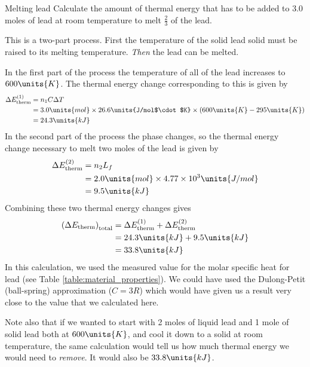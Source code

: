 \begin{example}{Melting lead}
  Calculate the amount of thermal energy that has to be added to 3.0 
  moles of lead at room temperature to melt $\frac{2}{3}$ of the lead. 

  \solution
  This is a two-part process.  First the temperature of the solid lead 
  solid must be raised to its melting temperature.  {\em Then} the 
  lead can be melted.

  In the first part of the process the temperature of all of the lead 
  increases to $600\units{K}$.  The thermal energy change corresponding 
  to this is given by 
  \begin{align}
    \Delta E_\text{therm}^{(1)} & = n_1C\Delta T \nonumber \\ 
    & = 3.0\units{mol}\times 26.6\units{J/mol$\cdot$K} \times
        (600\units{K} - 295\units{K}) \nonumber \\
    & = 24.3 \units{kJ}
  \end{align}
  In the second part of the process the phase changes, so the 
  thermal energy change necessary to melt two moles of the lead is given by
  \begin{align}
    \Delta E_\text{therm}^{(2)} & = n_2 L_f \nonumber \\ 
    & = 2.0\units{mol} \times 4.77\times 10^3\units{J/mol} \nonumber \\
    & = 9.5\units{kJ}
  \end{align}
  Combining these two thermal energy changes gives
  \begin{align}
    \left(\Delta E_\text{therm}\right)_\text{total} 
    & = \Delta E_\text{therm}^{(1)} + \Delta E_\text{therm}^{(2)} \nonumber \\
    & = 24.3\units{kJ} + 9.5\units{kJ} \nonumber \\
    & = 33.8\units{kJ} \
  \end{align} 
  In this calculation, we used the measured value for the molar
  specific heat for lead (see Table \ref{table:material_properties}).
  We could have used the Dulong-Petit (ball-spring) approximation ($C
  = 3R$) which would have given us a result very close to the value
  that we calculated here.

  Note also that if we wanted to start with 2 moles of liquid lead 
  and 1 mole of solid lead both at $600\units{K}$, and cool it down to 
  a solid at room temperature, the same calculation would
  tell us how much thermal energy we would need to {\em remove}.  It
  would also be $33.8\units{kJ}$.
\end{example}


